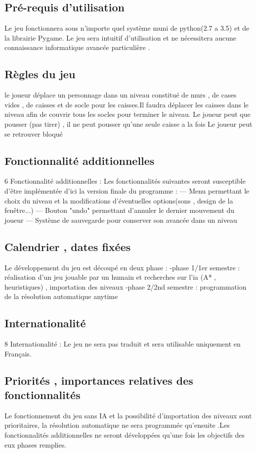 \documentclass{article}
\begin{document}
		\subsection{Pré-requis d'utilisation}
		Le jeu fonctionnera sous n’importe quel système muni de python(2.7 a 3.5) et
de la librairie Pygame. Le jeu sera intuitif d’utilisation et ne nécessitera aucune
connaissance informatique avancée particulière .
		\subsection{Règles du jeu}
		le joueur déplace un personnage dans un niveau constitué de murs , de cases
vides , de caisses et de socle pour les caisses.Il faudra déplacer les caisses dans
le niveau afin de couvrir tous les socles pour terminer le niveau. Le joueur peut
que pousser (pas tirer) , il ne peut pousser qu’une seule caisse a la fois Le joueur
peut se retrouver bloqué
		\subsection{Fonctionnalité additionnelles}
			6 Fonctionnalité additionnelles :
Les fonctionnalités suivantes seront susceptible d’être implémentée d’ici la
version finale du programme :
— Menu permettant le choix du niveau et la modifications d’éventuelles
options(sons , design de la fenêtre...)
— Bouton "undo" permettant d’annuler le dernier mouvement du joueur
— Système de sauvegarde pour conserver son avancée dans un niveau
		\subsection{Calendrier , dates fixées}
		Le développement du jeu est découpé en deux phase :
-phase 1/1er semestre : réalisation d’un jeu jouable par un humain et recherches
sur l’ia (A* , heuristiques) , importation des niveaux
-phase 2/2nd semestre : programmation de la résolution automatique anytime
		\subsection{Internationalité}
		8 Internationalité :
Le jeu ne sera pas traduit et sera utilisable uniquement en Français.
		\subsection{Priorités , importances relatives des fonctionnalités}
		Le fonctionnement du jeu sans IA et la possibilité d’importation des niveaux
sont prioritaires, la résolution automatique ne sera programmée qu’ensuite .Les
fonctionnalités additionnelles ne seront développées qu’une fois les objectifs des
eux phases remplies.
\newpage
\end{document}
